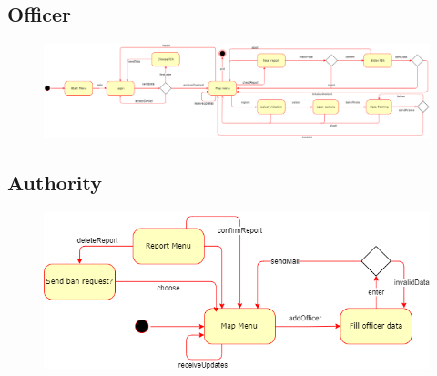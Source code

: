 \documentclass[12pt,a4paper]{article}
\begin{document}
	\subsection{Officer}
			\begin{figure}[H]
				\centering
				\begin{adjustwidth}{-25mm}{-25mm}
					        \includegraphics[width=.9\paperwidth,keepaspectratio]{Images/officer_states}
					\end{adjustwidth}
				\label{fig:automated_request_sequence}
			\end{figure}
	\subsection{Authority}
			\begin{figure}[H]
				\centering
				\includegraphics[width=.9\textwidth,keepaspectratio]{Images/authority_states}
				\label{fig:automated_request_sequence}
			\end{figure}
\end{document}
